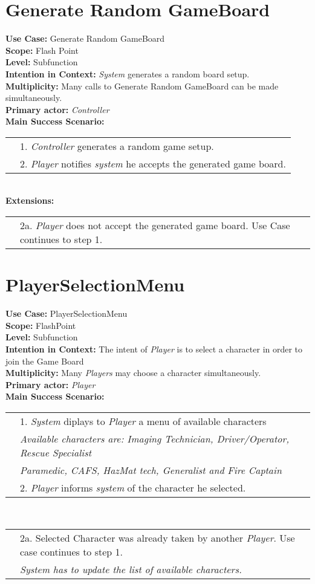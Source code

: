 \documentclass{article}
\begin{document}
	\section*{Generate Random GameBoard}
	\textbf{Use Case:} Generate Random GameBoard\\
	\textbf{Scope:} Flash Point\\
	\textbf{Level:} Subfunction\\
	\textbf{Intention in Context:} \textit{System} generates a random board setup.\\
	\textbf{Multiplicity:} Many calls to Generate Random GameBoard can be made simultaneously.\\
	\textbf{Primary actor:} \textit{Controller}\\
	\textbf{Main Success Scenario:}\\
	\begin{tabular}{l l}
		&1. \textit{Controller} generates a random game setup.\\
		&2. \textit{Player} notifies \textit{system} he accepts the generated game board.
	\end{tabular}\\
	\textbf{Extensions:}\\
	\begin{tabular}{l l}
		&2a. \textit{Player} does not accept the generated game board. Use Case continues to step 1. 
	\end{tabular}
	\section*{PlayerSelectionMenu}
	\textbf{Use Case:} PlayerSelectionMenu\\
	\textbf{Scope:} FlashPoint\\
	\textbf{Level:}  Subfunction\\
	\textbf{Intention in Context:} The intent of \textit{Player} is to select a character in order to join the Game Board\\
	\textbf{Multiplicity:} Many \textit{Players} may choose a character simultaneously.\\
	\textbf{Primary actor:} \textit{Player}\\
	\textbf{Main Success Scenario:}\\
	\begin{tabular}{l l}
		&1. \textit{System} diplays to \textit{Player} a menu of available characters\\
		&\qquad\textit{Available characters are: Imaging Technician, Driver/Operator, Rescue Specialist}\\
		&\qquad\qquad\textit{Paramedic, CAFS, HazMat tech, Generalist and Fire Captain }\\
		&2. \textit{Player} informs \textit{system} of the character he selected.
	\end{tabular}\\
	\begin{tabular}{l l}
		&2a. Selected Character was already taken by another \textit{Player}. Use case continues to step 1.\\
		&\qquad\textit{System has to update the list of available characters.}
	\end{tabular}
\end{document}
